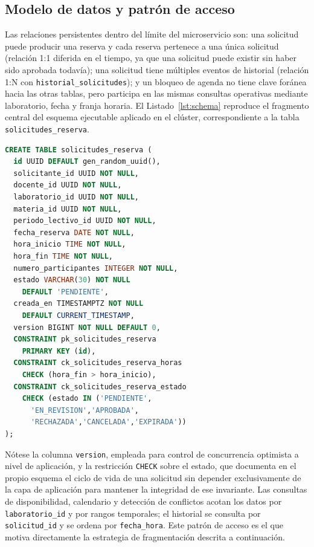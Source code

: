 \documentclass[10pt,twocolumn]{article}
\begin{document}
\subsection{Modelo de datos y patrón de acceso}
\label{sec:modelodatos}

Las relaciones persistentes dentro del límite del microservicio son: una
solicitud puede producir una reserva y cada reserva pertenece a una única
solicitud (relación 1:1 diferida en el tiempo, ya que una solicitud puede
existir sin haber sido aprobada todavía); una solicitud tiene múltiples
eventos de historial (relación 1:N con \texttt{historial\_solicitudes}); y
un bloqueo de agenda no tiene clave foránea hacia las otras tablas, pero
participa en las mismas consultas operativas mediante laboratorio, fecha y
franja horaria. El Listado~\ref{lst:schema} reproduce el fragmento
central del esquema ejecutable aplicado en el clúster, correspondiente a la
tabla \texttt{solicitudes\_reserva}.

\begin{lstlisting}[language=sql,caption={Fragmento de \texttt{db/schema.sql}: definición de \texttt{solicitudes\_reserva}.},label={lst:schema}]
CREATE TABLE solicitudes_reserva (
  id UUID DEFAULT gen_random_uuid(),
  solicitante_id UUID NOT NULL,
  docente_id UUID NOT NULL,
  laboratorio_id UUID NOT NULL,
  materia_id UUID NOT NULL,
  periodo_lectivo_id UUID NOT NULL,
  fecha_reserva DATE NOT NULL,
  hora_inicio TIME NOT NULL,
  hora_fin TIME NOT NULL,
  numero_participantes INTEGER NOT NULL,
  estado VARCHAR(30) NOT NULL
    DEFAULT 'PENDIENTE',
  creada_en TIMESTAMPTZ NOT NULL
    DEFAULT CURRENT_TIMESTAMP,
  version BIGINT NOT NULL DEFAULT 0,
  CONSTRAINT pk_solicitudes_reserva
    PRIMARY KEY (id),
  CONSTRAINT ck_solicitudes_reserva_horas
    CHECK (hora_fin > hora_inicio),
  CONSTRAINT ck_solicitudes_reserva_estado
    CHECK (estado IN ('PENDIENTE',
      'EN_REVISION','APROBADA',
      'RECHAZADA','CANCELADA','EXPIRADA'))
);
\end{lstlisting}

Nótese la columna \texttt{version}, empleada para control de concurrencia
optimista a nivel de aplicación, y la restricción \texttt{CHECK} sobre el
estado, que documenta en el propio esquema el ciclo de vida de una
solicitud sin depender exclusivamente de la capa de aplicación para
mantener la integridad de ese invariante. Las consultas de disponibilidad,
calendario y detección de conflictos acotan los datos por
\texttt{laboratorio\_id} y por rangos temporales; el historial se consulta
por \texttt{solicitud\_id} y se ordena por \texttt{fecha\_hora}. Este
patrón de acceso es el que motiva directamente la estrategia de
fragmentación descrita a continuación.
\end{document}
